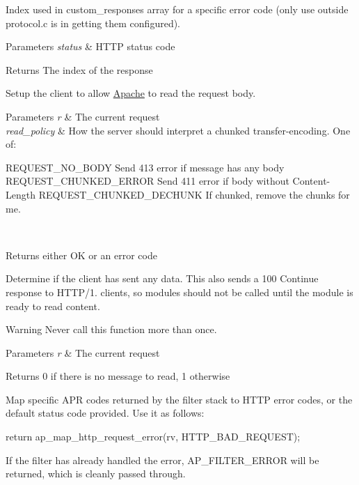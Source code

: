 Index used in custom\+\_\+responses array for a specific error code (only use outside protocol.\+c is in getting them configured). 
\begin{DoxyParams}{Parameters}
{\em status} & H\+T\+TP status code \\
\hline
\end{DoxyParams}
\begin{DoxyReturn}{Returns}
The index of the response
\end{DoxyReturn}
Setup the client to allow \hyperlink{namespaceApache}{Apache} to read the request body. 
\begin{DoxyParams}{Parameters}
{\em r} & The current request \\
\hline
{\em read\+\_\+policy} & How the server should interpret a chunked transfer-\/encoding. One of\+: 
\begin{DoxyPre}
   REQUEST\_NO\_BODY          Send 413 error if message has any body
   REQUEST\_CHUNKED\_ERROR    Send 411 error if body without Content-Length
   REQUEST\_CHUNKED\_DECHUNK  If chunked, remove the chunks for me.
\end{DoxyPre}
 \\
\hline
\end{DoxyParams}
\begin{DoxyReturn}{Returns}
either OK or an error code
\end{DoxyReturn}
Determine if the client has sent any data. This also sends a 100 Continue response to H\+T\+T\+P/1. clients, so modules should not be called until the module is ready to read content. \begin{DoxyWarning}{Warning}
Never call this function more than once. 
\end{DoxyWarning}

\begin{DoxyParams}{Parameters}
{\em r} & The current request \\
\hline
\end{DoxyParams}
\begin{DoxyReturn}{Returns}
0 if there is no message to read, 1 otherwise
\end{DoxyReturn}
Map specific A\+PR codes returned by the filter stack to H\+T\+TP error codes, or the default status code provided. Use it as follows\+:

return ap\+\_\+map\+\_\+http\+\_\+request\+\_\+error(rv, H\+T\+T\+P\+\_\+\+B\+A\+D\+\_\+\+R\+E\+Q\+U\+E\+S\+T);

If the filter has already handled the error, A\+P\+\_\+\+F\+I\+L\+T\+E\+R\+\_\+\+E\+R\+R\+OR will be returned, which is cleanly passed through.

